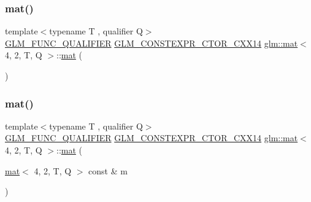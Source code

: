 \subsubsection{\texorpdfstring{mat()}{mat()}\hspace{0.1cm}{\footnotesize\ttfamily [1/21]}}
{\footnotesize\ttfamily template$<$typename T , qualifier Q$>$ \\
\hyperlink{setup_8hpp_a33fdea6f91c5f834105f7415e2a64407}{G\+L\+M\+\_\+\+F\+U\+N\+C\+\_\+\+Q\+U\+A\+L\+I\+F\+I\+ER} \hyperlink{setup_8hpp_a0900f9145e68bf6061b6f5e7be3fa751}{G\+L\+M\+\_\+\+C\+O\+N\+S\+T\+E\+X\+P\+R\+\_\+\+C\+T\+O\+R\+\_\+\+C\+X\+X14} \hyperlink{structglm_1_1mat}{glm\+::mat}$<$ 4, 2, T, Q $>$\+::\hyperlink{structglm_1_1mat}{mat} (\begin{DoxyParamCaption}{ }\end{DoxyParamCaption})}

\mbox{\label{structglm_1_1mat_3_014_00_012_00_01_t_00_01_q_01_4_a0713be6991a8f52680ba77634bc88c5b}} 
\subsubsection{\texorpdfstring{mat()}{mat()}\hspace{0.1cm}{\footnotesize\ttfamily [2/21]}}
{\footnotesize\ttfamily template$<$typename T , qualifier Q$>$ \\
\hyperlink{setup_8hpp_a33fdea6f91c5f834105f7415e2a64407}{G\+L\+M\+\_\+\+F\+U\+N\+C\+\_\+\+Q\+U\+A\+L\+I\+F\+I\+ER} \hyperlink{setup_8hpp_a0900f9145e68bf6061b6f5e7be3fa751}{G\+L\+M\+\_\+\+C\+O\+N\+S\+T\+E\+X\+P\+R\+\_\+\+C\+T\+O\+R\+\_\+\+C\+X\+X14} \hyperlink{structglm_1_1mat}{glm\+::mat}$<$ 4, 2, T, Q $>$\+::\hyperlink{structglm_1_1mat}{mat} (\begin{DoxyParamCaption}\item[{\hyperlink{structglm_1_1mat}{mat}$<$ 4, 2, T, Q $>$ const \&}]{m }\end{DoxyParamCaption})}

\mbox{\label{structglm_1_1mat_3_014_00_012_00_01_t_00_01_q_01_4_ad435b5f1f4b1647655ec65a9a8517e20}} 
